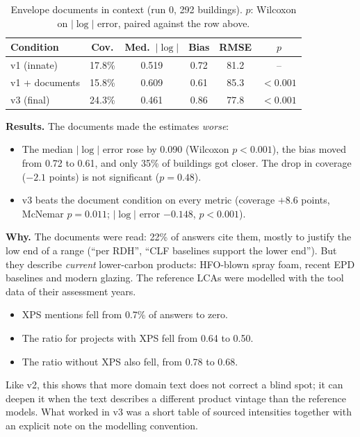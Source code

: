 \documentclass[10pt,letterpaper]{article}
\begin{document}
\begin{table}[t]
\centering\footnotesize
\caption{Envelope documents in context (run 0, 292 buildings). $p$: Wilcoxon on $|\log|$ error, paired against the row above.}
\label{tab:domain}
\setlength{\tabcolsep}{3.5pt}
\begin{tabular}{lccccc}
\toprule
Condition & Cov. & Med.\ $|\log|$ & Bias & RMSE & $p$ \\
\midrule
v1 (innate) & 17.8\% & 0.519 & 0.72 & 81.2 & -- \\
v1 + documents & 15.8\% & 0.609 & 0.61 & 85.3 & $<0.001$ \\
v3 (final) & 24.3\% & 0.461 & 0.86 & 77.8 & $<0.001$ \\
\bottomrule
\end{tabular}
\end{table}

\textbf{Results.} The documents made the estimates \emph{worse}:
\begin{itemize}
\item The median $|\log|$ error rose by 0.090 (Wilcoxon $p<0.001$), the bias moved from 0.72 to 0.61, and only 35\% of buildings got closer. The drop in coverage ($-2.1$ points) is not significant ($p=0.48$).
\item v3 beats the document condition on every metric (coverage $+8.6$ points, McNemar $p=0.011$; $|\log|$ error $-0.148$, $p<0.001$).
\end{itemize}

\textbf{Why.} The documents were read: 22\% of answers cite them, mostly to justify the low end of a range (``per RDH'', ``CLF baselines support the lower end''). But they describe \emph{current} lower-carbon products: HFO-blown spray foam, recent EPD baselines and modern glazing. The reference LCAs were modelled with the tool data of their assessment years.
\begin{itemize}
\item XPS mentions fell from 0.7\% of answers to zero.
\item The ratio for projects with XPS fell from 0.64 to 0.50.
\item The ratio without XPS also fell, from 0.78 to 0.68.
\end{itemize}
Like v2, this shows that more domain text does not correct a blind spot; it can deepen it when the text describes a different product vintage than the reference models. What worked in v3 was a short table of sourced intensities together with an explicit note on the modelling convention.
\end{document}
